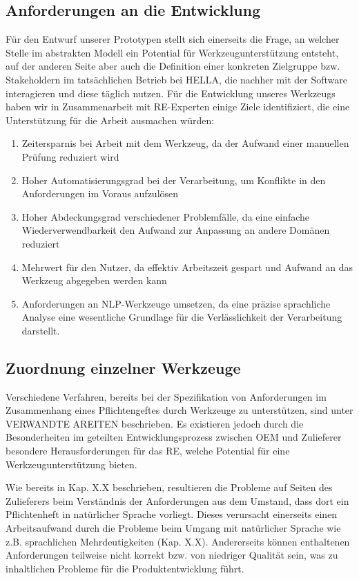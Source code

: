 \documentclass[12pt]{report}
\begin{document}
\subsection{Anforderungen an die Entwicklung}
Für den Entwurf unserer Prototypen stellt sich einerseits die Frage, an welcher Stelle im abstrakten Modell ein Potential für Werkzeugunterstützung entsteht, auf der anderen Seite aber auch die Definition einer konkreten Zielgruppe bzw. Stakeholdern im tatsächlichen Betrieb bei HELLA, die nachher mit der Software interagieren und diese täglich nutzen.
Für die Entwicklung unseres Werkzeugs haben wir in Zusammenarbeit mit RE-Experten einige Ziele identifiziert, die eine Unterstützung für die Arbeit ausmachen würden:
\begin{enumerate}
\item Zeitersparnis bei Arbeit mit dem Werkzeug, da der Aufwand einer manuellen Prüfung reduziert wird
\item Hoher Automatisierungsgrad bei der Verarbeitung, um Konflikte in den Anforderungen im Voraus aufzulösen
\item Hoher Abdeckungsgrad verschiedener Problemfälle, da eine einfache Wiederverwendbarkeit den Aufwand zur Anpassung an andere Domänen reduziert
\item Mehrwert für den Nutzer, da effektiv Arbeitszeit gespart und Aufwand an das Werkzeug abgegeben werden kann
\item Anforderungen an NLP-Werkzeuge umsetzen, da eine präzise sprachliche Analyse eine wesentliche Grundlage für die Verlässlichkeit der Verarbeitung darstellt.
\end{enumerate}
\subsection{Zuordnung einzelner Werkzeuge}
Verschiedene Verfahren, bereits bei der Spezifikation von Anforderungen im Zusammenhang eines Pflichtengeftes durch Werkzeuge zu unterstützen, sind unter VERWANDTE AREITEN beschrieben. Es existieren jedoch durch die Besonderheiten im geteilten Entwicklungsprozess zwischen OEM und Zulieferer besondere Herausforderungen für das RE, welche Potential für eine Werkzeugunterstützung bieten. 

Wie bereits in Kap. X.X beschrieben, resultieren die Probleme auf Seiten des Zulieferers beim Verständnis der Anforderungen aus dem Umstand, dass dort ein Pflichtenheft in natürlicher Sprache vorliegt. Dieses verursacht einerseits einen Arbeitsaufwand durch die Probleme beim Umgang mit natürlicher Sprache wie z.B. sprachlichen Mehrdeutigkeiten (Kap. X.X). Andererseits können enthaltenen Anforderungen teilweise nicht korrekt bzw. von niedriger Qualität sein, was zu inhaltlichen Probleme für die Produktentwicklung führt. 
\end{document}
